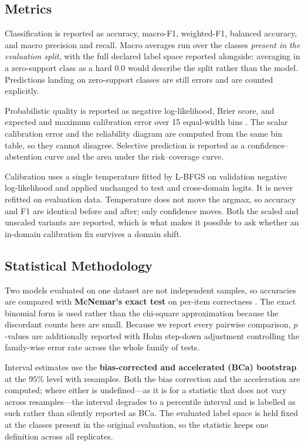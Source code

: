 \documentclass[runningheads]{llncs}
\begin{document}
\subsection{Metrics}

Classification is reported as accuracy, macro-F1, weighted-F1, balanced
accuracy, and macro precision and recall. Macro averages run over the classes
\emph{present in the evaluation split}, with the full declared label space
reported alongside: averaging in a zero-support class as a hard $0.0$ would
describe the split rather than the model. Predictions landing on zero-support
classes are still errors and are counted explicitly.

Probabilistic quality is reported as negative log-likelihood, Brier score, and
expected and maximum calibration error over 15 equal-width bins
\cite{naeini2015ece}. The scalar calibration error and the reliability diagram
are computed from the same bin table, so they cannot disagree. Selective
prediction \cite{geifman2017selective} is reported as a confidence--abstention
curve and the area under the risk--coverage curve.

Calibration uses a single temperature fitted by L-BFGS on validation
negative log-likelihood and applied unchanged to test and cross-domain logits.
It is never refitted on evaluation data. Temperature does not move the argmax,
so accuracy and F1 are identical before and after; only confidence moves. Both
the scaled and unscaled variants are reported, which is what makes it possible
to ask whether an in-domain calibration fix survives a domain shift.

\subsection{Statistical Methodology}
\label{sec:stats}

Two models evaluated on one dataset are not independent samples, so accuracies
are compared with \textbf{McNemar's exact test} on per-item correctness
\cite{mcnemar1947,dietterich1998tests}. The exact binomial form is used rather
than the chi-square approximation because the discordant counts here are small.
Because we report every pairwise comparison, $p$-values are additionally
reported with Holm step-down adjustment \cite{holm1979} controlling the
family-wise error rate across the whole family of tests.

Interval estimates use the \textbf{bias-corrected and accelerated (BCa)
bootstrap} \cite{efron1987bca,efron1993bootstrap} at the $95\%$ level with
\NBootstrap{} resamples. Both the bias correction and the acceleration are
computed; where either is undefined---as it is for a statistic that does not
vary across resamples---the interval degrades to a percentile interval and is
labelled as such rather than silently reported as BCa. The evaluated label space
is held fixed at the classes present in the original evaluation, so the
statistic keeps one definition across all replicates.
\end{document}
